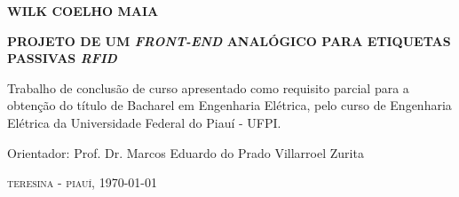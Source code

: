 \begin{center}
\textbf{\Large WILK COELHO MAIA}
\par
\vspace{4cm}
\textbf{\Large PROJETO DE UM \textit{FRONT-END} ANALÓGICO PARA ETIQUETAS PASSIVAS \textit{RFID}}
\end{center}
\par
\vspace{4cm}
\hspace*{160pt}\parbox{9cm}{{Trabalho de conclusão de curso apresentado como requisito parcial para a obtenção do título de Bacharel em Engenharia Elétrica, pelo curso de Engenharia Elétrica da Universidade Federal do Piauí - UFPI.}}
\vspace{2cm}
\par\hspace*{160pt}\parbox{10cm}{Orientador: Prof. Dr. Marcos Eduardo do Prado Villarroel Zurita}
\vfill
\begin{center}
\textsc{\large teresina - piauí, \today}\\
\end{center}
\newpage


